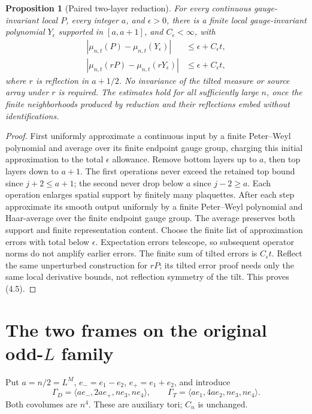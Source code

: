 \documentclass[11pt]{article}
\newtheorem{proposition}[theorem]{Proposition}
\theoremstyle{remark}
\begin{document}
\begin{proposition}[Paired two-layer reduction]\label{prop:layers}
For every continuous gauge-invariant local $P$, every integer $a$,
and $\epsilon>0$, there is a finite local gauge-invariant polynomial
$Y_\epsilon$ supported in $[a,a+1]$, and $C_\epsilon<\infty$, with
\[
 \begin{split}
 |\mu_{n,t}(P)-\mu_{n,t}(Y_\epsilon)|&\le\epsilon+C_\epsilon t,\\
 |\mu_{n,t}(rP)-\mu_{n,t}(rY_\epsilon)|&\le\epsilon+C_\epsilon t,
 \end{split}
 \tag{4.5}
\]
where $r$ is reflection in $a+1/2$. No invariance of the tilted
measure or source array under $r$ is required. The estimates hold
for all sufficiently large $n$, once the finite neighborhoods produced
by reduction and their reflections embed without identifications.
\end{proposition}
\begin{proof}
First uniformly approximate a continuous input by a finite Peter--Weyl
polynomial and average over its finite endpoint gauge group, charging
this initial approximation to the total $\epsilon$ allowance.
Remove bottom layers up to $a$, then top layers down to $a+1$.
The first operations never exceed the retained top bound since
$j+2\le a+1$; the second never drop below $a$ since $j-2\ge a$.
Each operation enlarges spatial support by finitely many plaquettes.
After each step approximate its smooth output uniformly by a finite
Peter--Weyl polynomial and Haar-average over the finite endpoint gauge
group. The average preserves both support and finite representation
content. Choose the finite list of approximation errors with total
below $\epsilon$. Expectation errors telescope, so subsequent operator
norms do not amplify earlier errors. The finite sum of tilted errors
is $C_\epsilon t$. Reflect the same unperturbed construction for
$rP$; its tilted error proof needs only the same local derivative
bounds, not reflection symmetry of the tilt. This proves (4.5).
\end{proof}

\section{The two frames on the original odd-$L$ family}
\label{sec:geometry}

Put $a=n/2=L^M$, $e_-=e_1-e_2$, $e_+=e_1+e_2$, and introduce
\[
 \Gamma_D=\langle ae_-,2ae_+,ne_3,ne_4\rangle,\qquad
 \Gamma_T=\langle ae_1,4ae_2,ne_3,ne_4\rangle.
 \tag{5.1}
\]
Both covolumes are $n^4$. These are auxiliary tori; $C_n$ is unchanged.
\end{document}
